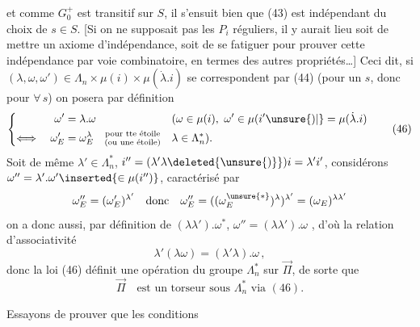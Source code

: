 et comme $G_0^+$ est transitif sur $S$, il s'ensuit bien que (43) est indépendant du choix de $s\in S$. [Si on ne supposait pas les $P_i$ réguliers, il y aurait lieu soit de mettre un axiome d'indépendance, soit de se fatiguer pour prouver cette indépendance par voie combinatoire, en termes des autres propriétés\ldots] Ceci dit, si $(\lambda,\omega,\omega')\in\Lambda_n\times\mu(i)\times\mu(\dot\lambda.i)$ se correspondent par (44) (pour un $s$, donc pour $\forall\,s$) on posera par définition
\[
\left\{\begin{aligned}
 \omega'&=\lambda.\omega &&(\omega\in\mu(i),\ \omega'\in\mu(i'\unsure{)|\vphantom{)}}=\mu(\dot\lambda.i)\\
 \Longleftrightarrow\quad\omega'_E&=\omega_E^\lambda
 \quad\substack{\text{pour tte étoile}\\\text{(ou une étoile)}}&&\lambda\in\Lambda_n^*).
\end{aligned}\right.
\tag*{(46)}
\]
Soit de même $\lambda'\in\Lambda_n^*$, $i''=(\lambda'\lambda\deleted{\unsure{)}})i=\lambda'i'$, considérons $\omega''=\lambda'.\omega'\inserted{\in\mu(i'')}$, caractérisé par
\[
\omega''_E=(\omega'_E)^{\lambda'}\quad\text{donc}\quad
 \omega''_E=((\omega^{\unsure{*}}_E)^\lambda)^{\lambda'}=(\omega_E)^{\lambda\lambda'}
\]
on a donc aussi, par définition de $(\lambda\lambda').\omega^{*}$, $\omega''=(\lambda\lambda').\omega$ , d'où la relation d'associativité
\[
\lambda'(\lambda\omega)=(\lambda'\lambda).\omega\,,\tag*{(47)}
\]
donc la loi (46) définit  une opération du groupe $\Lambda_n^*$ sur $\vec\Pi$,  de sorte que
\[
\vec\Pi\quad\text{est un torseur sous }\Lambda_n^*\text{ via }(46).\tag*{(48)}
\]

 Essayons de prouver que les conditions
